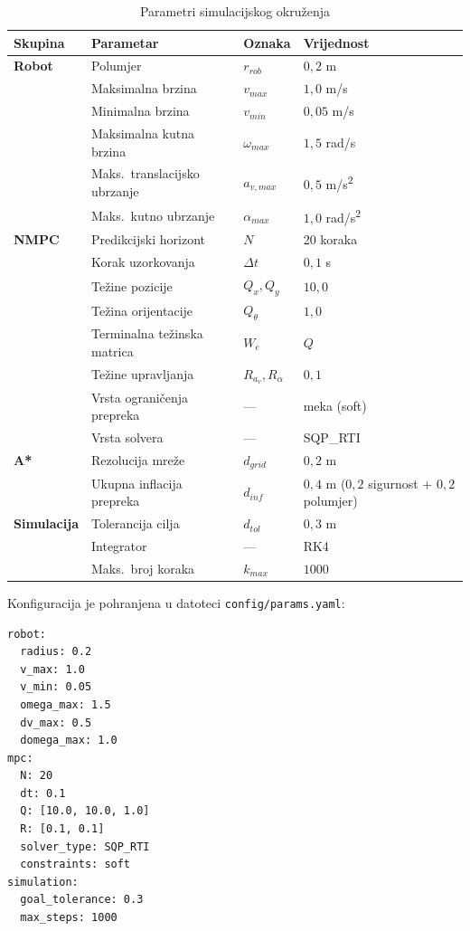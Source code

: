 \begin{table}[H]
\centering
\caption{Parametri simulacijskog okruženja}
\label{tab:params}
\begin{tabular}{llll}
\toprule
Skupina & Parametar & Oznaka & Vrijednost \\
\midrule
\textbf{Robot} & Polumjer & $r_{rob}$ & $0{,}2$ m \\
 & Maksimalna brzina & $v_{max}$ & $1{,}0$ m/s \\
 & Minimalna brzina & $v_{min}$ & $0{,}05$ m/s \\
 & Maksimalna kutna brzina & $\omega_{max}$ & $1{,}5$ rad/s \\
 & Maks.\ translacijsko ubrzanje & $a_{v,max}$ & $0{,}5$ m/s\textsuperscript{2} \\
 & Maks.\ kutno ubrzanje & $\alpha_{max}$ & $1{,}0$ rad/s\textsuperscript{2} \\
\midrule
\textbf{NMPC} & Predikcijski horizont & $N$ & 20 koraka \\
 & Korak uzorkovanja & $\Delta t$ & $0{,}1$ s \\
 & Težine pozicije & $Q_x, Q_y$ & $10{,}0$ \\
 & Težina orijentacije & $Q_\theta$ & $1{,}0$ \\
 & Terminalna težinska matrica & $W_e$ & $Q$ \\
 & Težine upravljanja & $R_{a_v}, R_{\alpha}$ & $0{,}1$ \\
 & Vrsta ograničenja prepreka & — & meka (soft) \\
 & Vrsta solvera & — & SQP\_RTI \\
\midrule
\textbf{A*} & Rezolucija mreže & $d_{grid}$ & $0{,}2$ m \\
 & Ukupna inflacija prepreka & $d_{inf}$ & $0{,}4$ m ($0{,}2$ sigurnost $+$ $0{,}2$ polumjer) \\
\midrule
\textbf{Simulacija} & Tolerancija cilja & $d_{tol}$ & $0{,}3$ m \\
 & Integrator & — & RK4 \\
 & Maks.\ broj koraka & $k_{max}$ & $1000$ \\
\bottomrule
\end{tabular}
\end{table}

Konfiguracija je pohranjena u datoteci \texttt{config/params.yaml}:

\begin{listing}[H]
\begin{verbatim}
robot:
  radius: 0.2
  v_max: 1.0
  v_min: 0.05
  omega_max: 1.5
  dv_max: 0.5
  domega_max: 1.0
mpc:
  N: 20
  dt: 0.1
  Q: [10.0, 10.0, 1.0]
  R: [0.1, 0.1]
  solver_type: SQP_RTI
  constraints: soft
simulation:
  goal_tolerance: 0.3
  max_steps: 1000
\end{verbatim}
\caption{Ključni parametri u \texttt{config/params.yaml}}
\end{listing}

